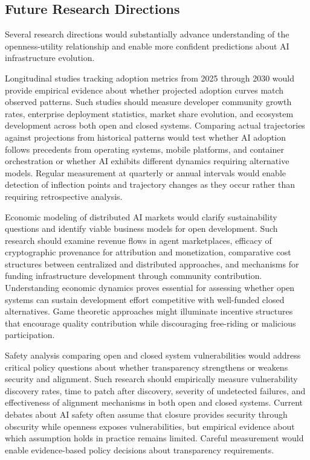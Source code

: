 \subsection{Future Research Directions}

Several research directions would substantially advance understanding of the openness-utility relationship and enable more confident predictions about AI infrastructure evolution.

Longitudinal studies tracking adoption metrics from 2025 through 2030 would provide empirical evidence about whether projected adoption curves match observed patterns. Such studies should measure developer community growth rates, enterprise deployment statistics, market share evolution, and ecosystem development across both open and closed systems. Comparing actual trajectories against projections from historical patterns would test whether AI adoption follows precedents from operating systems, mobile platforms, and container orchestration or whether AI exhibits different dynamics requiring alternative models. Regular measurement at quarterly or annual intervals would enable detection of inflection points and trajectory changes as they occur rather than requiring retrospective analysis.

Economic modeling of distributed AI markets would clarify sustainability questions and identify viable business models for open development. Such research should examine revenue flows in agent marketplaces, efficacy of cryptographic provenance for attribution and monetization, comparative cost structures between centralized and distributed approaches, and mechanisms for funding infrastructure development through community contribution. Understanding economic dynamics proves essential for assessing whether open systems can sustain development effort competitive with well-funded closed alternatives. Game theoretic approaches might illuminate incentive structures that encourage quality contribution while discouraging free-riding or malicious participation.

Safety analysis comparing open and closed system vulnerabilities would address critical policy questions about whether transparency strengthens or weakens security and alignment. Such research should empirically measure vulnerability discovery rates, time to patch after discovery, severity of undetected failures, and effectiveness of alignment mechanisms in both open and closed systems. Current debates about AI safety often assume that closure provides security through obscurity while openness exposes vulnerabilities, but empirical evidence about which assumption holds in practice remains limited. Careful measurement would enable evidence-based policy decisions about transparency requirements.

